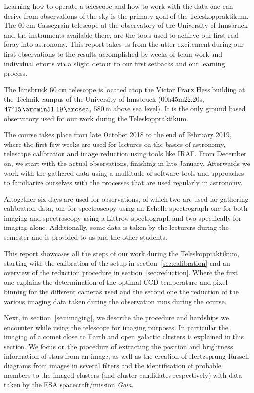 \documentclass{article}
\begin{document}
Learning how to operate a telescope and how to work with the data one can derive from observations of the sky is the primary goal of the \ldq Teleskoppraktikum\rdq. The $\SI{60}{\cm}$ Cassegrain telescope at the observatory of the University of Innsbruck and the instruments available there, are the tools used to achieve our first real foray into astronomy. This report takes us from the utter excitement during our first observations to the results accomplished by weeks of team work and individual efforts via a slight detour to our first setbacks and our learning process. 

The Innsbruck $\SI{60}{\cm}$ telescope is located  atop the Victor Franz Hess building at the Technik campus of the University of Innsbruck ($00$h$45$m$22.20$s, $\SI{47}{\degree} \SI{15}{\arcmin}\SI{51.19}{\arcsec}$, $\SI{580}{\m}$ above sea level). It is the only ground based observatory used for our work during the \ldq Teleskoppraktikum\rdq.

The course takes place from late October 2018 to the end of February 2019, where the first few weeks are used for lectures on the basics of astronomy, telescope calibration and image reduction using tools like IRAF. From December on, we start with the actual observations, finishing in late January. Afterwards we work with the gathered data using a multitude of software tools and approaches to familiarize ourselves with the processes that are used regularly in astronomy.

Altogether six days are used for observations, of which two are used for gathering calibration data, one for spectroscopy using an Echelle spectrograph one for both imaging and spectroscopy using a Littrow spectrograph and two specifically for imaging alone. Additionally, some data is taken by the lecturers during the semester and is provided to us and the other students. 

This report showcases all the steps of our work during the \ldq Teleskoppraktikum\rdq, starting with the calibration of the setup in section~\ref{sec:calibration} and an overview of the reduction procedure in section~\ref{sec:reduction}. Where the first one explains the determination of the optimal CCD temperature and pixel binning for the different cameras used and the second one the reduction of the various imaging data taken during the observation runs during the course. 

Next, in section~\ref{sec:imaging}, we describe the procedure and hardships we encounter while using the telescope for imaging purposes. In particular the imaging of a comet close to Earth and open galactic clusters is explained in this section. We focus on the procedure of extracting the position and brightness information of stars from an image, as well as the creation of Hertzsprung-Russell diagrams from images in several filters and the identification of probable members to the imaged clusters (and cluster candidates respectively) with data taken by the ESA spacecraft/mission \textit{Gaia}. 
\end{document}
